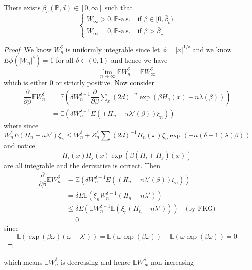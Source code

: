 \begin{proposition}
    There exists $\bar{\beta}_c(\mathbb{P},d) \in [0,\infty]$ such that
    \[
    \begin{cases}
        W_{\infty} > 0, \mathbb{P}\text{-a.s.}\quad\text{if }\beta\in[0,\bar{\beta}_c) \\
        W_{\infty} = 0, \mathbb{P}\text{-a.s.}\quad\text{if }\beta>\bar{\beta}_c
    \end{cases}
    \]
\end{proposition}
\begin{proof}
    We know $W_n^{\delta}$ is uniformly integrable since let $\phi = |x|^{1/\delta}$ and we know $E\phi(|W_n|^\delta) = 1$ for all $\delta \in (0,1)$ and hence we have
    \[
    \lim\limits_{n\to\infty} \mathbb{E}W_n^{\delta} = \mathbb{E}W_{\infty}^{\delta}
    \]
    which is either $0$ or strictly positive. Now consider
    \[
    \begin{aligned}
        \dfrac{\partial}{\partial \beta} \mathbb{E}W_{n}^{\delta} & = \mathbb{E}(\delta W_n^{\delta-1} \dfrac{\partial}{\partial \beta} \sum\limits_{x} (2d)^{-n} \exp{(\beta H_n(x) - n\lambda(\beta))})\\
        & = \mathbb{E}(\delta W_n^{\delta-1}E((H_n-n\lambda'(\beta))\xi_n))
    \end{aligned}
    \]
    where since
    \[
    W_n^{\delta}E(H_n-n\lambda')\xi_n \leq W_n^{\delta} + Z_n^{\delta}\sum(2d)^{-1} H_n(x)\xi_n \exp(-n(\delta-1)\lambda(\beta))
    \]
    and notice
    \[
    H_i(x)H_j(x)\exp(\beta(H_i+H_j)(x))
    \]
    are all integrable and the derivative is correct. Then
    \[
     \begin{aligned}
        \dfrac{\partial}{\partial \beta} \mathbb{E}W_{n}^{\delta} 
        & = \mathbb{E}(\delta W_n^{\delta-1}E((H_n-n\lambda'(\beta))\xi_n))
        \\
        & = \delta E\mathbb{E}(\xi_n W_n^{\delta - 1}(H_n-n\lambda')) \\
        &\leq \delta E(\mathbb{E}W_n^{\delta-1} \mathbb{E}(\xi_n(H_n - n\lambda')))\quad\text{(by FKG)}\\
        &=0
    \end{aligned}
    \]
    since
    \[
    \mathbb{E}(\exp(\beta\omega)(\omega - \lambda')) = \mathbb{E}(\omega\exp(\beta\omega)) - \mathbb{E}(\omega\exp(\beta\omega)) = 0
    \]
\end{proof}
which means $\mathbb{E}W_n^{\delta}$ is decreasing and hence $\mathbb{E}W_{\infty}^{\delta}$ non-increasing

